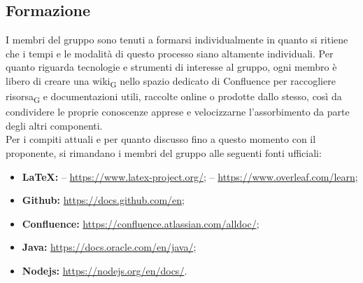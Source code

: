 \subsection{Formazione}
    I membri del gruppo \group sono tenuti a formarsi individualmente in quanto si ritiene che i tempi e le modalità di questo processo siano altamente individuali. Per quanto riguarda tecnologie e strumenti di interesse al gruppo, ogni membro è libero di creare una wiki\textsubscript{G} nello spazio dedicato di Confluence per raccogliere risorsa\textsubscript{G} e documentazioni utili, raccolte online o prodotte dallo stesso, così da condividere le proprie conoscenze apprese e velocizzarne l'assorbimento da parte degli altri componenti. \\
    Per i compiti attuali e per quanto discusso fino a questo momento con il proponente, si rimandano i membri del gruppo alle seguenti fonti ufficiali:
    \begin{itemize}
        \item \textbf{\LaTeX: }
            \subitem -- \url{https://www.latex-project.org/};
            \subitem -- \url{https://www.overleaf.com/learn};
        \item \textbf{Github: }\url{https://docs.github.com/en};
        \item \textbf{Confluence: }\url{https://confluence.atlassian.com/alldoc/};
        \item \textbf{Java: }\url{https://docs.oracle.com/en/java/};
        \item \textbf{Nodejs: }\url{https://nodejs.org/en/docs/}.
    \end{itemize}
